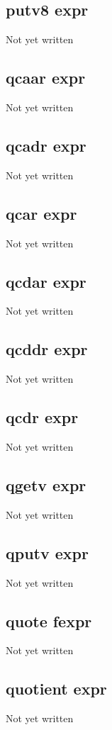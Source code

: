 \documentclass[a4paper,11pt]{article}
\begin{document}
{\subsection{\ttfamily putv8 expr}
   Not yet written

\subsection{\ttfamily qcaar expr}
   Not yet written

\subsection{\ttfamily qcadr expr}
   Not yet written

\subsection{\ttfamily qcar expr}
   Not yet written

\subsection{\ttfamily qcdar expr}
   Not yet written

\subsection{\ttfamily qcddr expr}
   Not yet written

\subsection{\ttfamily qcdr expr}
   Not yet written

\subsection{\ttfamily qgetv expr}
   Not yet written

\subsection{\ttfamily qputv expr}
   Not yet written

\subsection{\ttfamily quote fexpr}
   Not yet written

\subsection{\ttfamily quotient expr}
   Not yet written

}
\end{document}
